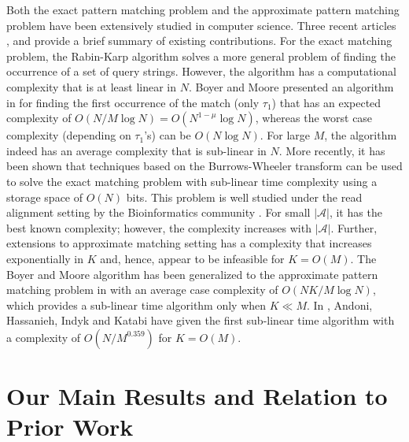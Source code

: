 Both the exact pattern matching problem and the approximate pattern matching problem have been extensively studied in computer science.
Three recent articles \cite{andoni2013shift}, \cite{amir2004faster} and \cite{navarro2001guided} provide a brief summary of existing contributions.
For the exact matching problem, the Rabin-Karp algorithm solves a more general problem of finding the occurrence of a set of query strings.
However, the algorithm has a computational complexity that is at least linear in $N$. Boyer and Moore presented an algorithm in \cite{boyer1977fast} for finding the first occurrence of the match (only $\tau_1$) that has an expected complexity of $O(N/M \log N) = O(N^{1-\mu} \log N)$, whereas the worst case complexity (depending on $\tau_1$'s) can be $O(N \log N)$. For large $M$, the algorithm indeed has an average complexity that is sub-linear in $N$. More recently, it has been shown that techniques based on the Burrows-Wheeler transform can be used to solve the exact matching problem with sub-linear time complexity \cite{ferragina2005indexing} using a storage space of $O(N)$ bits. This problem is well studied under the read alignment setting by the Bioinformatics community \cite{li2009fast,li2010fast}. For small $|\mathcal{A}|$, it has the best known complexity; however, the complexity increases with $|\mathcal{A}|$. Further, extensions to approximate matching setting \cite{zhang2003approximate} has a complexity that increases exponentially in $K$ and, hence, appear to be infeasible for $K = O(M)$. The Boyer and Moore algorithm has been generalized to the approximate pattern matching problem in \cite{chang1994approximate} with an average case complexity of $O(NK/M \log N)$, which provides a sub-linear time algorithm only when $K \ll M$. In \cite{andoni2013shift}, Andoni, Hassanieh, Indyk and Katabi have given the first sub-linear time algorithm with a complexity of $O(N/M^{0.359})$ for $K = O(M)$.

\section{Our Main Results and Relation to Prior Work}
\label{sec:mainresults}


